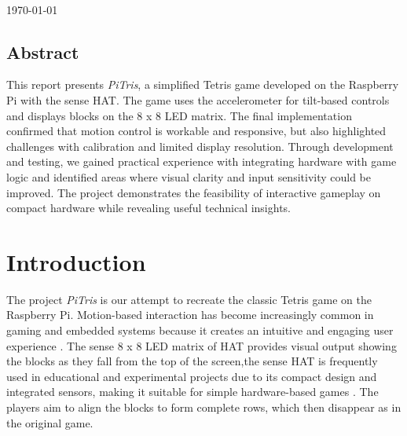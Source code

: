 \documentclass[12pt]{report}
\begin{document}
\begin{titlepage}
\begin{minipage}{0.4\textwidth}
\end{minipage}\\[2cm]



{\large \today}\\[2cm] %

\vfill %

\end{titlepage}


\section*{Abstract}
This report presents \textit{PiTris}, a simplified Tetris game developed on the Raspberry Pi with the sense HAT. The game uses the accelerometer for tilt-based controls and displays blocks on the 8 x 8 LED matrix. The final implementation confirmed that motion control is workable and responsive, but also highlighted challenges with calibration and limited display resolution. Through development and testing, we gained practical experience with integrating hardware with game logic and identified areas where visual clarity and input sensitivity could be improved. The project demonstrates the feasibility of interactive gameplay on compact hardware while revealing useful technical insights.


\vspace{1cm}
\tableofcontents   
\newpage 

\chapter{Introduction}

The project \textit{PiTris} is our attempt to recreate the classic Tetris game on the Raspberry Pi. Motion-based interaction has become increasingly common  in gaming and embedded systems because it creates an intuitive and engaging user experience . The sense 8 x 8 LED matrix of HAT provides visual output showing the blocks as they fall from the top of the screen,the sense HAT is frequently used in educational and experimental projects  due to its compact design and integrated sensors, making it suitable for simple hardware-based games\cite{raspberrypi2023} . The players aim to align the blocks to form complete rows, which then disappear as in the original game.  
\end{document}
